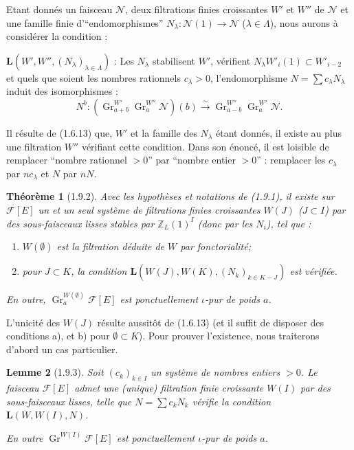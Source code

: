 \documentclass[12pt,a4paper]{article}
\theoremstyle{plain}
\newtheorem{theorem}{Th\'eor\`eme}[section]
\newtheorem{lemma}[theorem]{Lemme}
\theoremstyle{definition}
\theoremstyle{remark}
\DeclareMathOperator{\Gr}{Gr}
\newcommand{\ZZ}{{\mathbb{Z}}}
\begin{document}
Etant donn\'es un faisceau $\mathscr{N}$, deux filtrations finies croissantes $W'$ et $W''$ de $\mathscr{N}$ et une famille finie d'``endomorphismes'' $N_\lambda : \mathscr{N}(1) \to \mathscr{N}$ ($\lambda \in \Lambda$), nous aurons \`a consid\'erer la condition :

$\mathbf{L}(W', W'', (N_\lambda)_{\lambda \in \Lambda})$ : Les $N_\lambda$ stabilisent $W'$, v\'erifient $N_\lambda W'_i(1) \subset W'_{i-2}$ et quels que soient les nombres rationnels $c_\lambda > 0$, l'endomorphisme $N = \sum c_\lambda N_\lambda$ induit des isomorphismes :
\[ N^b : (\Gr_{a+b}^{W'} \Gr_a^{W''} \mathscr{N})(b) \xrightarrow{\sim} \Gr_{a-b}^{W''} \Gr_a^{W'} \mathscr{N}. \]

Il r\'esulte de (1.6.13) que, $W'$ et la famille des $N_\lambda$ \'etant donn\'es, il existe au plus une filtration $W''$ v\'erifiant cette condition. Dans son \'enonc\'e, il est loisible de remplacer ``nombre rationnel $> 0$'' par ``nombre entier $> 0$'' : remplacer les $c_\lambda$ par $nc_\lambda$ et $N$ par $nN$.


\begin{theorem}[1.9.2]
Avec les hypoth\`eses et notations de (1.9.1), il existe sur $\mathscr{F}[E]$ un et un seul syst\`eme de filtrations finies croissantes $W(J)$ ($J \subset I$) par des sous-faisceaux lisses stables par $\ZZ_L(1)^I$ (donc par les $N_i$), tel que :
\begin{enumerate}[label=\alph*)]
\item $W(\emptyset)$ est la filtration d\'eduite de $W$ par fonctorialit\'e;
\item pour $J \subset K$, la condition $\mathbf{L}(W(J), W(K), (N_k)_{k \in K-J})$ est v\'erifi\'ee.
\end{enumerate}
En outre, $\Gr_a^{W(\emptyset)} \mathscr{F}[E]$ est ponctuellement $\iota$-pur de poids $a$.
\end{theorem}

L'unicit\'e des $W(J)$ r\'esulte aussit\^ot de (1.6.13) (et il suffit de disposer des conditions a), et b) pour $\emptyset \subset K$). Pour prouver l'existence, nous traiterons d'abord un cas particulier.

\begin{lemma}[1.9.3]
Soit $(c_k)_{k \in I}$ un syst\`eme de nombres entiers $> 0$. Le faisceau $\mathscr{F}[E]$ admet une (unique) filtration finie croissante $W(I)$ par des sous-faisceaux lisses, telle que $N = \sum c_k N_k$ v\'erifie la condition $\mathbf{L}(W, W(I), N)$.

En outre $\Gr^{W(I)} \mathscr{F}[E]$ est ponctuellement $\iota$-pur de poids $a$.
\end{lemma}
\end{document}
